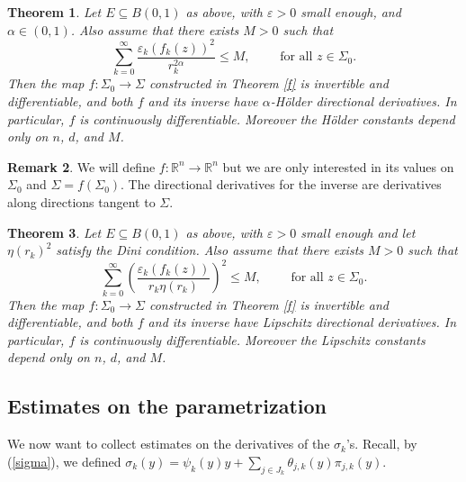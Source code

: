 \documentclass[11pt, twoside, leqno]{article}
\numberwithin{equation}{section}
\theoremstyle{plain}
\newtheorem{thm}{Theorem}[section]
\theoremstyle{definition}
\newtheorem{rk}[thm]{Remark}
\newcommand{\R}{\mathbb{R}}
\newcommand{\e}{\varepsilon} %
\begin{document}
\begin{thm} \label{epsilonk11}
Let $E \subseteq B(0,1)$ as above, with $\e>0$ small enough, and $\alpha \in (0,1)$. Also assume that there exists $M >0$ such that
\begin{equation} \label{beta2r_alpha}
\sum_{k=0}^{\infty} \frac{ \e_k(f_k(z))^2}{r_k^{2\alpha}} \leq M, \qquad \text{ for all $z \in \Sigma_0$}.
\end{equation}
Then the map $f \colon \Sigma_0 \to \Sigma$ constructed in Theorem \ref{f} is invertible and differentiable, and both $f$ and its inverse have $\alpha$-H\"older directional derivatives. In particular, $f$ is continuously differentiable. Moreover the H\"older constants depend only on $n$, $d$, and $M$.
\end{thm}

\begin{rk}
We will define $f \colon \R^n \to \R^n$ but we are only interested in its values on $\Sigma_0$ and $\Sigma=f(\Sigma_0)$. The directional derivatives for the inverse are derivatives along directions tangent to $\Sigma$.
\end{rk}


\begin{thm} \label{logtheorem}
Let $E \subseteq B(0,1)$ as above, with $\e>0$ small enough and let $\eta(r_k)^2$ satisfy the Dini condition. Also assume that there exists $M >0$ such that
\begin{equation} \label{beta2r}
\sum_{k=0}^{\infty} \left( \frac{\e_k(f_k(z))}{r_k\eta(r_k)}\right)^2 \leq M, \qquad \text{ for all $z \in \Sigma_0$}.
\end{equation}
Then the map $f \colon \Sigma_0 \to \Sigma$ constructed in Theorem \ref{f} is invertible and differentiable, and both $f$ and its inverse have Lipschitz directional derivatives. In particular, $f$ is continuously differentiable. Moreover the Lipschitz constants depend only on $n$, $d$, and $M$.
\end{thm}

\subsection{Estimates on the parametrization}

We now want to collect estimates on the derivatives of the $\sigma_k$'s. Recall, by (\ref{sigma}), we defined  $\sigma_k(y)= \psi_k(y)y + \sum_{j \in J_k} \theta_{j,k}(y)\pi_{j,k}(y)$.
\end{document}
